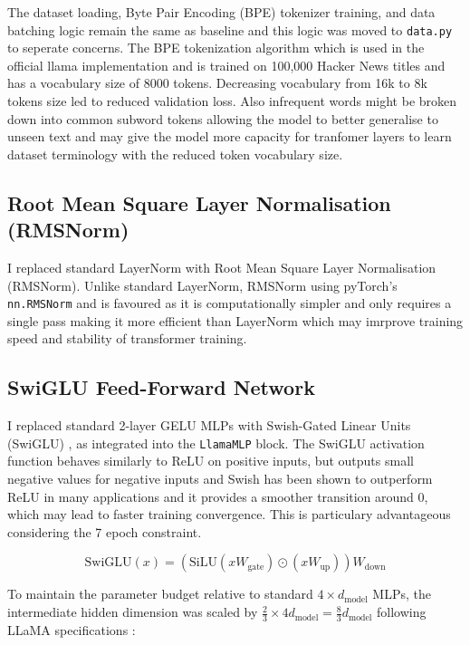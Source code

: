 \documentclass[11pt,a4paper]{article}
\begin{document}
The dataset loading,  Byte Pair Encoding (BPE) tokenizer training, and data batching logic remain the same as baseline and this logic was moved to \texttt{data.py} to seperate concerns. The BPE tokenization algorithm which is used in the official llama implementation \cite{llama} and is trained on 100,000 Hacker News titles and has a vocabulary size of 8000 tokens. Decreasing vocabulary from 16k to 8k tokens size led to reduced validation loss. Also infrequent words might be broken down into common subword tokens allowing the model to better generalise to unseen text and may give the model more capacity for tranfomer layers to learn dataset terminology with the reduced token vocabulary size.

\subsection{Root Mean Square Layer Normalisation (RMSNorm)}
I replaced standard LayerNorm with Root Mean Square Layer Normalisation (RMSNorm). Unlike standard LayerNorm, RMSNorm using pyTorch's \texttt{nn.RMSNorm} and is favoured as it is computationally simpler and only requires a single pass making it more efficient than LayerNorm \cite{rmsnorm}  which may imrprove training speed and stability of transformer training.


\subsection{SwiGLU Feed-Forward Network}
I replaced standard 2-layer GELU MLPs with Swish-Gated Linear Units (SwiGLU) \cite{swiglu}, as integrated into the \texttt{LlamaMLP} block. The SwiGLU activation function behaves similarly to ReLU on positive inputs, but outputs small negative values for negative inputs \cite{llama-3-guide} and Swish has been shown to outperform ReLU in many applications and it provides a smoother transition around 0, which may lead to faster training convergence. This is particulary advantageous considering the 7 epoch constraint. 

\begin{equation}
\text{SwiGLU}(x) = \left(\text{SiLU}(x W_{\text{gate}}) \odot (x W_{\text{up}})\right) W_{\text{down}}
\end{equation}


To maintain the parameter budget relative to standard $4 \times d_{\text{model}}$ MLPs, the intermediate hidden dimension was scaled by $\frac{2}{3} \times 4 d_{\text{model}} = \frac{8}{3} d_{\text{model}}$ following LLaMA specifications \cite{llama}:
\end{document}

